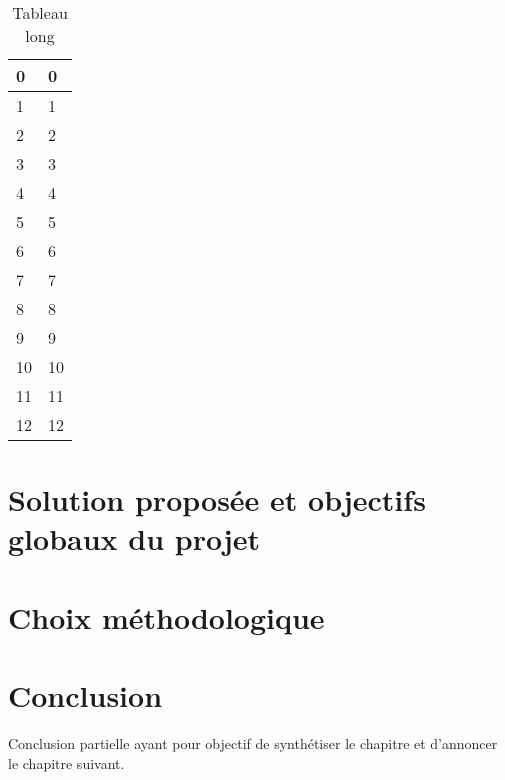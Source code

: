 \begin{longtable}[c]{
    |p{}
    |p{}|
}
    \caption{Tableau long}
    \label{tab:myfirstlongtable}\\
    \hline
    
    0
    & 0 \\
    \hline 
    
    1
    & 1 \\
    \hline 
    
    2
    & 2 \\
    \hline
    
    3
    & 3 \\
    \hline
    
    4
    & 4 \\
    \hline
    
    5
    & 5 \\ \hline
    
    6
    & 6 \\ \hline
    
    7
    & 7 \\
    \hline
    
    8
    & 8 \\
    \hline
    
    9
    & 9 \\
    \hline
    
    10
    & 10 \\
    \hline
    
    11
    & 11 \\
    \hline
    
    12
    & 12 \\
    \hline
\end{longtable}

\section{Solution proposée et objectifs globaux du projet}

\section{Choix méthodologique}

\section*{Conclusion}
    Conclusion partielle ayant pour objectif de synthétiser le chapitre et d’annoncer le chapitre suivant.